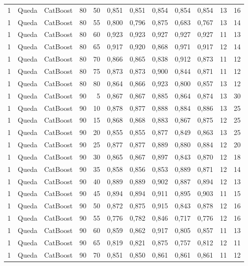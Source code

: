 \begin{longtable}{ccclrrrrrrrr}
1 & Queda & CatBoost & 80 & 50 & 0,851 & 0,851 & 0,854 & 0,854 & 0,854 & 13 & 16 \\
1 & Queda & CatBoost & 80 & 55 & 0,800 & 0,796 & 0,875 & 0,683 & 0,767 & 13 & 14 \\
1 & Queda & CatBoost & 80 & 60 & 0,923 & 0,923 & 0,927 & 0,927 & 0,927 & 11 & 13 \\
1 & Queda & CatBoost & 80 & 65 & 0,917 & 0,920 & 0,868 & 0,971 & 0,917 & 12 & 14 \\
1 & Queda & CatBoost & 80 & 70 & 0,866 & 0,865 & 0,838 & 0,912 & 0,873 & 11 & 12 \\
1 & Queda & CatBoost & 80 & 75 & 0,873 & 0,873 & 0,900 & 0,844 & 0,871 & 11 & 12 \\
1 & Queda & CatBoost & 80 & 80 & 0,864 & 0,866 & 0,923 & 0,800 & 0,857 & 13 & 12 \\
1 & Queda & CatBoost & 90 & 5 & 0,867 & 0,867 & 0,885 & 0,864 & 0,874 & 13 & 30 \\
1 & Queda & CatBoost & 90 & 10 & 0,878 & 0,877 & 0,888 & 0,884 & 0,886 & 13 & 25 \\
1 & Queda & CatBoost & 90 & 15 & 0,868 & 0,868 & 0,883 & 0,867 & 0,875 & 12 & 25 \\
1 & Queda & CatBoost & 90 & 20 & 0,855 & 0,855 & 0,877 & 0,849 & 0,863 & 13 & 25 \\
1 & Queda & CatBoost & 90 & 25 & 0,877 & 0,877 & 0,889 & 0,880 & 0,884 & 12 & 20 \\
1 & Queda & CatBoost & 90 & 30 & 0,865 & 0,867 & 0,897 & 0,843 & 0,870 & 12 & 18 \\
1 & Queda & CatBoost & 90 & 35 & 0,858 & 0,856 & 0,853 & 0,889 & 0,871 & 12 & 14 \\
1 & Queda & CatBoost & 90 & 40 & 0,889 & 0,889 & 0,902 & 0,887 & 0,894 & 12 & 13 \\
1 & Queda & CatBoost & 90 & 45 & 0,894 & 0,894 & 0,911 & 0,895 & 0,903 & 11 & 15 \\
1 & Queda & CatBoost & 90 & 50 & 0,872 & 0,875 & 0,915 & 0,843 & 0,878 & 12 & 16 \\
1 & Queda & CatBoost & 90 & 55 & 0,776 & 0,782 & 0,846 & 0,717 & 0,776 & 12 & 16 \\
1 & Queda & CatBoost & 90 & 60 & 0,859 & 0,862 & 0,917 & 0,805 & 0,857 & 11 & 13 \\
1 & Queda & CatBoost & 90 & 65 & 0,819 & 0,821 & 0,875 & 0,757 & 0,812 & 12 & 11 \\
1 & Queda & CatBoost & 90 & 70 & 0,851 & 0,850 & 0,861 & 0,861 & 0,861 & 11 & 12 \\

\end{longtable}
